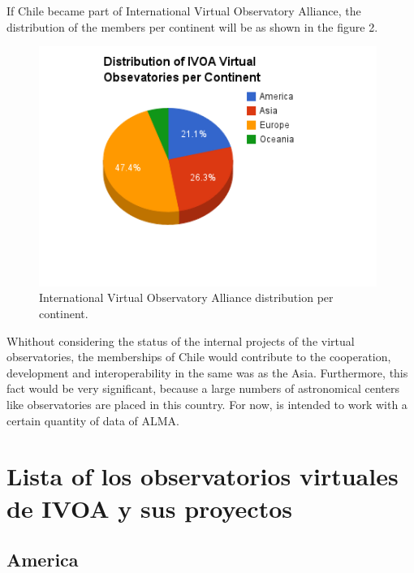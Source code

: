 \documentclass[11pt]{article}
\begin{document}
             If Chile became part of International Virtual Observatory Alliance,
the distribution of the members per continent will be as shown in the figure
2.\\

             \begin{figure}[h]
                 \begin{center}
                     \includegraphics[width=110mm]
{IVOA_VOs_distribution_per_continent_by_JDMT.png}
                     \caption{International Virtual Observatory Alliance
distribution per continent.}
                 \end{center}
             \end{figure}

             Whithout considering the status of the internal projects of the
virtual observatories, the memberships of Chile would contribute to the
cooperation, development and interoperability in the same was as the Asia.
Furthermore, this fact would be very significant, because a large numbers of
astronomical centers like observatories are placed in this country. For now, is
intended to work with a certain quantity of data of ALMA.\\

     \section{Lista of los observatorios virtuales de IVOA y sus proyectos}
         \subsection{America}
\end{document}
